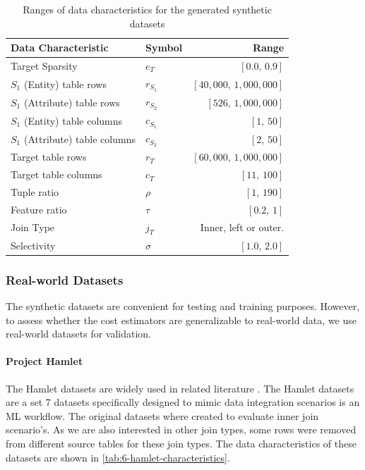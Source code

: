 \begin{table}[ht]
    \centering
    \begin{tabular}{llr}
        \toprule
        Data Characteristic             & Symbol    & Range                              \\ \midrule \midrule
        Target Sparsity                 & $e_T$     & $[ 0.0\text{,\ \ } 0.9]$           \\
        $S_1$ (Entity) table rows       & $r_{S_1}$ & $[ 40,000\text{,\ \ } 1,000,000]$  \\
        $S_1$ (Attribute) table rows    & $r_{S_2}$ & $[ 526\text{,\ \ } 1,000,000]$     \\
        $S_1$ (Entity) table columns    & $c_{S_1}$ & $[ 1\text{,\ \ } 50]$              \\
        $S_1$ (Attribute) table columns & $c_{S_2}$ & $[ 2\text{,\ \ } 50]$              \\
        Target table rows               & $r_T$     & $[ 60,000 \text{,\ \ } 1,000,000]$ \\
        Target table columns            & $c_T$     & $[ 11\text{,\ \ } 100]$            \\
        Tuple ratio                     & $\rho$    & $[ 1\text{,\ \ } 190]$             \\
        Feature ratio                   & $\tau$    & $[ 0.2\text{,\ \ } 1]$             \\
        Join Type                       & $j_T$     & Inner, left or outer.              \\
        Selectivity                     & $\sigma$  & $[ 1.0\text{,\ \ } 2.0]$           \\
        \bottomrule
    \end{tabular}
    \caption{Ranges of data characteristics for the generated synthetic datasets}
    \label{tab:6-synthetic-dataset-characteristics}
\end{table}


\subsubsection{Real-world Datasets}
The synthetic datasets are convenient for testing and training purposes. However, to assess whether the cost estimators are generalizable to real-world data, we use real-world datasets for validation.

\paragraph{Project Hamlet \cite{2016-hamlet-sigmod}}
The Hamlet datasets are widely used in related literature \cite{2016-hamlet-sigmod, amalur, morpheus,orion_learning_gen_lin_models}. The Hamlet datasets are a set 7 datasets specifically designed to mimic data integration scenarios is an ML workflow. The original datasets where created to evaluate inner join scenario's. As we are also interested in other join types, some rows were removed from different source tables for these join types. The data characteristics of these datasets are shown in \autoref{tab:6-hamlet-characteristics}.


